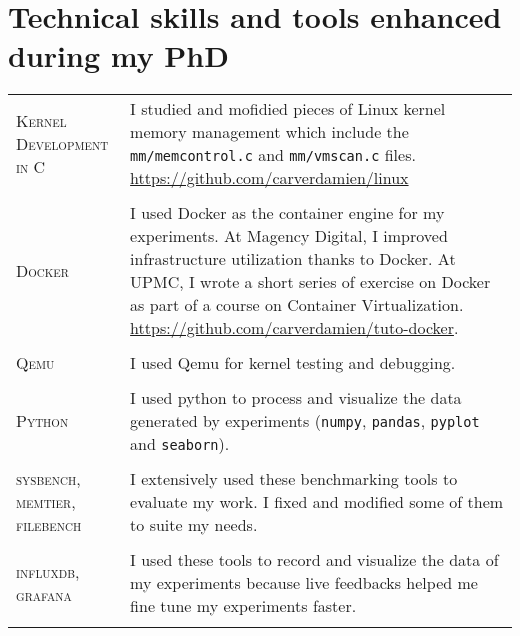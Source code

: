 

\section{Technical skills and tools enhanced during my PhD}

\begin{tabular}{p{2cm}|p{11cm}}

\textsc{Kernel \newline Development in C} & I studied and mofidied pieces of Linux kernel memory management which include the \texttt{mm/memcontrol.c} and \texttt{mm/vmscan.c} files. \href{https://github.com/carverdamien/linux}{https://github.com/carverdamien/linux}\\
\multicolumn{2}{c}{} \\

\textsc{Docker} & I used Docker as the container engine for my experiments. At Magency Digital, I improved infrastructure utilization thanks to Docker. At UPMC, I wrote a short series of exercise on Docker as part of a course on Container Virtualization. \href{https://github.com/carverdamien/tuto-docker}{https://github.com/carverdamien/tuto-docker}.\\
\multicolumn{2}{c}{} \\

\textsc{Qemu} & I used Qemu for kernel testing and debugging.\\
\multicolumn{2}{c}{} \\

\textsc{Python} & I used python to process and visualize the data generated by experiments (\texttt{numpy}, \texttt{pandas}, \texttt{pyplot} and \texttt{seaborn}).\\
\multicolumn{2}{c}{} \\

\textsc{sysbench, memtier, filebench} &  I extensively used these benchmarking tools to evaluate my work. I fixed and modified some of them to suite my needs.\\
\multicolumn{2}{c}{} \\

\textsc{influxdb, grafana} & I used these tools to record and visualize the data of my experiments because live feedbacks helped me fine tune my experiments faster.\\
\multicolumn{2}{c}{} \\

\end{tabular}

